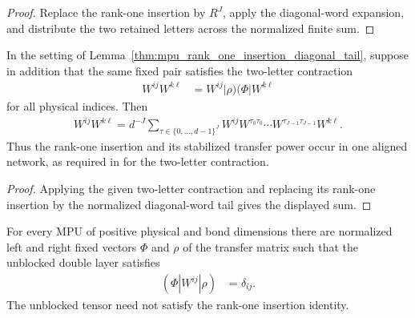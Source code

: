 \begin{proof}\leanok
    Replace the rank-one insertion by $R^J$, apply the diagonal-word
    expansion, and distribute the two retained letters across the normalized
    finite sum.
\end{proof}

\begin{lemma}
    \label{thm:mpu_simple_two_letter_diagonal_tail}
    \leanok
    In the setting of Lemma~\ref{thm:mpu_rank_one_insertion_diagonal_tail},
    suppose in addition that the
    same fixed pair satisfies the two-letter contraction
    \begin{align}
        W^{ij}W^{k\ell}
         & =W^{ij}\lvert\rho)(\Phi\rvert W^{k\ell}
    \end{align}
    for all physical indices.  Then
    \begin{align}
        W^{ij}W^{k\ell}
        =d^{-J}\sum_{\tau\in\{0,\ldots,d-1\}^J}
        W^{ij}W^{\tau_0\tau_0}\cdots
        W^{\tau_{J-1}\tau_{J-1}}W^{k\ell}.
    \end{align}
    Thus the rank-one insertion and its stabilized transfer power occur in
    one aligned network, as required in \cite[Theorem~III.8, Section~III.B, equations~(31)--(32)]{Cirac2017MPU} for the two-letter
    contraction.
\end{lemma}

\begin{proof}\leanok
    Applying the given two-letter contraction and replacing its rank-one
    insertion by the normalized diagonal-word tail gives the displayed sum.
\end{proof}

\begin{lemma}
    \label{thm:mpu_simple1}
    \leanok
    For every MPU of positive physical and bond dimensions there are normalized
    left and right fixed vectors $\Phi$ and $\rho$ of the transfer matrix such
    that the unblocked double layer satisfies
    \begin{align}
        (\Phi|W^{ij}|\rho) & =\delta_{ij}.
    \end{align}
    The unblocked tensor need not satisfy the rank-one insertion identity.
\end{lemma}

